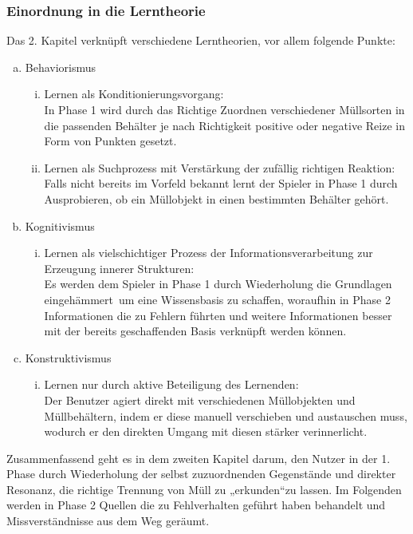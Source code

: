 \documentclass[a4paper]{article}
\begin{document}
        \subsubsection{Einordnung in die Lerntheorie}
            Das 2. Kapitel verknüpft verschiedene Lerntheorien, vor allem folgende Punkte:
            \begin{enumerate}[(a)]
                \item Behaviorismus
                \begin{enumerate}[(i)]
                    \item Lernen als Konditionierungsvorgang:\\
                    In Phase 1 wird durch das Richtige Zuordnen verschiedener Müllsorten in die passenden Behälter je nach Richtigkeit positive oder negative Reize in Form von Punkten gesetzt.

                    \item Lernen als Suchprozess mit Verstärkung der zufällig richtigen Reaktion:\\
                    Falls nicht bereits im Vorfeld bekannt lernt der Spieler in Phase 1 durch Ausprobieren, ob ein Müllobjekt in einen bestimmten Behälter gehört.
                \end{enumerate}

                \item Kognitivismus
                \begin{enumerate}[(i)]
                    \item Lernen als vielschichtiger Prozess der Informationsverarbeitung zur Erzeugung innerer Strukturen:\\
                    Es werden dem Spieler in Phase 1 durch Wiederholung die Grundlagen \glqq eingehämmert\grqq\ um eine Wissensbasis zu schaffen, woraufhin in Phase 2 Informationen die zu Fehlern führten und weitere Informationen besser mit der bereits geschaffenden Basis verknüpft werden können.
                \end{enumerate}

                \item Konstruktivismus
                \begin{enumerate}[(i)]
                    \item Lernen nur durch aktive Beteiligung des Lernenden:\\
                    Der Benutzer agiert direkt mit verschiedenen Müllobjekten und Müllbehältern, indem er diese manuell verschieben und austauschen muss, wodurch er den direkten Umgang mit diesen stärker verinnerlicht.
                \end{enumerate}
            \end{enumerate}
            Zusammenfassend geht es in dem zweiten Kapitel darum, den Nutzer in der 1. Phase durch Wiederholung der selbst zuzuordnenden Gegenstände und direkter Resonanz, die richtige Trennung von Müll zu „erkunden“zu lassen. Im Folgenden werden in Phase 2 Quellen die zu Fehlverhalten geführt haben behandelt und Missverständnisse aus dem Weg geräumt.
\end{document}
